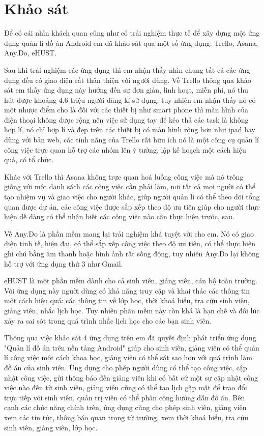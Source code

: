 \documentclass[../Main.tex]{subfiles}
\begin{document}
\section{Khảo sát}
Để có cái nhìn khách quan cũng như có trải nghiệm thực tế để xây dựng một ứng dụng quản lí đồ án Android em đã khảo sát qua một số ứng dụng: Trello, Asana, Any.Do, eHUST.

Sau khi trải nghiệm các ứng dụng thì em nhận thấy nhìn chung tất cả các ứng dụng đều có giao diện rất thân thiện với người dùng. Về Trello thông qua khảo sát em thấy ứng dụng này hướng đến sự đơn giản, linh hoạt, miễn phí, nó thu hút được khoảng 4.6 triệu người đăng kí sử dụng, tuy nhiên em nhận thấy nó có một nhược điểm cho là đối với các thiết bị như smart phone thì màn hình của điện thoại không được rộng nên việc sử dụng tay để kéo thả các task là không hợp lí, nó chỉ hợp lí và đẹp trên các thiết bị có màn hình rộng hơn như ipad hay dùng với bản web, các tính năng của Trello rất hữu ích nó là một công cụ quản lí công việc trực quan hỗ trợ các nhóm lên ý tưởng, lập kế hoạch một cách hiệu quả, có tổ chức.

Khác với Trello thì Asana không trực quan hoá luồng công việc mà nó trông giống với một danh sách các công việc cần phải làm, nơi tất cả mọi người có thể tạo nhiệm vụ và giao việc cho người khác, giúp người quản lí có thể theo dõi tổng quan được dự án, các công việc được sắp xếp theo độ ưu tiên giúp cho người thực hiện dế dàng có thể nhận biết các công việc nào cần thực hiện trước, sau. 

Về Any.Do là phần mềm mang lại trải nghiệm khá tuyệt vời cho em. Nó có giao diện tinh tế, hiện đại, có thể sắp xếp công việc theo độ ưu tiên, có thể thực hiện ghi chú bằng âm thanh hoặc hình ảnh rất sống động, tuy nhiên Any.Do lại không hỗ trợ với ứng dụng thứ 3 như Gmail.

eHUST là một phần mềm dành cho cả sinh viên, giảng viên, cán bộ toàn trường. Với ứng dụng này người dùng có khả năng truy cập và khai thác các thông tin một cách hiệu quá: các thông tin về lớp học, thời khoá biểu, tra cứu sinh viên, giảng viên, nhắc lịch học. Tuy nhiên phần mềm này còn khá là hạn chế và đôi lúc xảy ra sai sót trong quá trình nhắc lịch học cho các bạn sinh viên. 

Thông qua việc khảo sát 4 ứng dụng trên em đã quyết định phát triển ứng dụng "Quản lí đồ án trên nền tảng Android" giúp cho sinh viên, giảng viên có thể quản lí công việc một cách khoa học, giảng viên có thể sát sao hơn với quá trình làm đồ án của sinh viên. Ứng dụng cho phép người dùng có thể tạo công việc, cập nhật công việc, gửi thông báo đến giảng viên khi có bất cứ một sự cập nhật công việc nào đến từ sinh viên, giảng viên cũng có thể tạo lịch gặp mặt để trao đổi trực tiếp với sinh viên, quản trị viên có thể phân công hướng dẫn đồ án. Bên cạnh các chức năng chính trên, ứng dụng cũng cho phép sinh viên, giảng viên xem các tin tức, thông báo quan trọng từ trường, xem thời khoá biểu, tra cứu sinh viên, giảng viên, lớp học. 
\end{document}
